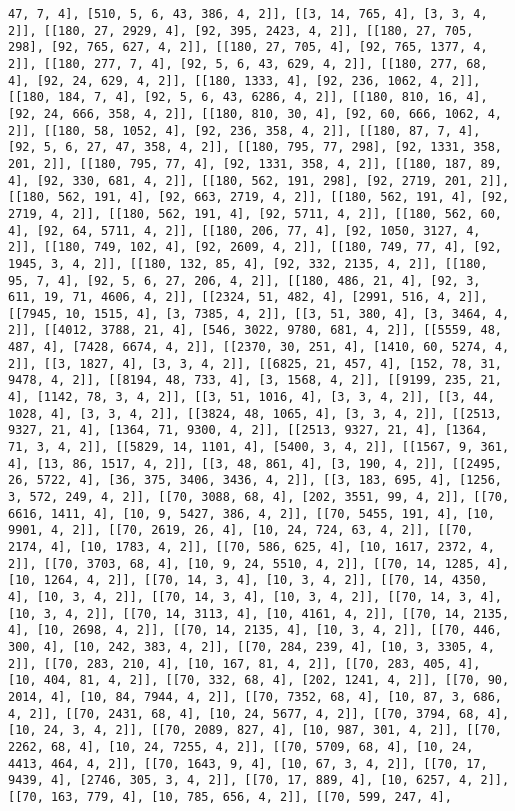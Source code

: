 \documentclass[12pt,fleqn]{article}\usepackage{../../common}
\begin{document}
\begin{verbatim}
47, 7, 4], [510, 5, 6, 43, 386, 4, 2]], [[3, 14, 765, 4], [3, 3, 4, 2]], [[180, 27, 2929, 4], [92, 395, 2423, 4, 2]], [[180, 27, 705, 298], [92, 765, 627, 4, 2]], [[180, 27, 705, 4], [92, 765, 1377, 4, 2]], [[180, 277, 7, 4], [92, 5, 6, 43, 629, 4, 2]], [[180, 277, 68, 4], [92, 24, 629, 4, 2]], [[180, 1333, 4], [92, 236, 1062, 4, 2]], [[180, 184, 7, 4], [92, 5, 6, 43, 6286, 4, 2]], [[180, 810, 16, 4], [92, 24, 666, 358, 4, 2]], [[180, 810, 30, 4], [92, 60, 666, 1062, 4, 2]], [[180, 58, 1052, 4], [92, 236, 358, 4, 2]], [[180, 87, 7, 4], [92, 5, 6, 27, 47, 358, 4, 2]], [[180, 795, 77, 298], [92, 1331, 358, 201, 2]], [[180, 795, 77, 4], [92, 1331, 358, 4, 2]], [[180, 187, 89, 4], [92, 330, 681, 4, 2]], [[180, 562, 191, 298], [92, 2719, 201, 2]], [[180, 562, 191, 4], [92, 663, 2719, 4, 2]], [[180, 562, 191, 4], [92, 2719, 4, 2]], [[180, 562, 191, 4], [92, 5711, 4, 2]], [[180, 562, 60, 4], [92, 64, 5711, 4, 2]], [[180, 206, 77, 4], [92, 1050, 3127, 4, 2]], [[180, 749, 102, 4], [92, 2609, 4, 2]], [[180, 749, 77, 4], [92, 1945, 3, 4, 2]], [[180, 132, 85, 4], [92, 332, 2135, 4, 2]], [[180, 95, 7, 4], [92, 5, 6, 27, 206, 4, 2]], [[180, 486, 21, 4], [92, 3, 611, 19, 71, 4606, 4, 2]], [[2324, 51, 482, 4], [2991, 516, 4, 2]], [[7945, 10, 1515, 4], [3, 7385, 4, 2]], [[3, 51, 380, 4], [3, 3464, 4, 2]], [[4012, 3788, 21, 4], [546, 3022, 9780, 681, 4, 2]], [[5559, 48, 487, 4], [7428, 6674, 4, 2]], [[2370, 30, 251, 4], [1410, 60, 5274, 4, 2]], [[3, 1827, 4], [3, 3, 4, 2]], [[6825, 21, 457, 4], [152, 78, 31, 9478, 4, 2]], [[8194, 48, 733, 4], [3, 1568, 4, 2]], [[9199, 235, 21, 4], [1142, 78, 3, 4, 2]], [[3, 51, 1016, 4], [3, 3, 4, 2]], [[3, 44, 1028, 4], [3, 3, 4, 2]], [[3824, 48, 1065, 4], [3, 3, 4, 2]], [[2513, 9327, 21, 4], [1364, 71, 9300, 4, 2]], [[2513, 9327, 21, 4], [1364, 71, 3, 4, 2]], [[5829, 14, 1101, 4], [5400, 3, 4, 2]], [[1567, 9, 361, 4], [13, 86, 1517, 4, 2]], [[3, 48, 861, 4], [3, 190, 4, 2]], [[2495, 26, 5722, 4], [36, 375, 3406, 3436, 4, 2]], [[3, 183, 695, 4], [1256, 3, 572, 249, 4, 2]], [[70, 3088, 68, 4], [202, 3551, 99, 4, 2]], [[70, 6616, 1411, 4], [10, 9, 5427, 386, 4, 2]], [[70, 5455, 191, 4], [10, 9901, 4, 2]], [[70, 2619, 26, 4], [10, 24, 724, 63, 4, 2]], [[70, 2174, 4], [10, 1783, 4, 2]], [[70, 586, 625, 4], [10, 1617, 2372, 4, 2]], [[70, 3703, 68, 4], [10, 9, 24, 5510, 4, 2]], [[70, 14, 1285, 4], [10, 1264, 4, 2]], [[70, 14, 3, 4], [10, 3, 4, 2]], [[70, 14, 4350, 4], [10, 3, 4, 2]], [[70, 14, 3, 4], [10, 3, 4, 2]], [[70, 14, 3, 4], [10, 3, 4, 2]], [[70, 14, 3113, 4], [10, 4161, 4, 2]], [[70, 14, 2135, 4], [10, 2698, 4, 2]], [[70, 14, 2135, 4], [10, 3, 4, 2]], [[70, 446, 300, 4], [10, 242, 383, 4, 2]], [[70, 284, 239, 4], [10, 3, 3305, 4, 2]], [[70, 283, 210, 4], [10, 167, 81, 4, 2]], [[70, 283, 405, 4], [10, 404, 81, 4, 2]], [[70, 332, 68, 4], [202, 1241, 4, 2]], [[70, 90, 2014, 4], [10, 84, 7944, 4, 2]], [[70, 7352, 68, 4], [10, 87, 3, 686, 4, 2]], [[70, 2431, 68, 4], [10, 24, 5677, 4, 2]], [[70, 3794, 68, 4], [10, 24, 3, 4, 2]], [[70, 2089, 827, 4], [10, 987, 301, 4, 2]], [[70, 2262, 68, 4], [10, 24, 7255, 4, 2]], [[70, 5709, 68, 4], [10, 24, 4413, 464, 4, 2]], [[70, 1643, 9, 4], [10, 67, 3, 4, 2]], [[70, 17, 9439, 4], [2746, 305, 3, 4, 2]], [[70, 17, 889, 4], [10, 6257, 4, 2]], [[70, 163, 779, 4], [10, 785, 656, 4, 2]], [[70, 599, 247, 4], 
\end{verbatim}
\end{document}
